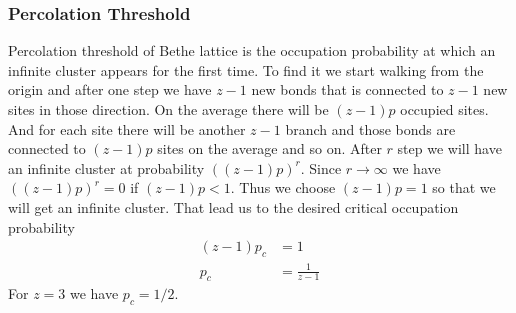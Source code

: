 	\subsubsection{Percolation Threshold}
	Percolation threshold of Bethe lattice is the occupation probability at which an infinite cluster appears for the first time. To find it we start walking from the origin and after one step we have $z-1$ new bonds that is connected to $z-1$ new sites in those direction. On the average there will be $(z-1)p$ occupied sites. And for each site there will be another $z-1$ branch and those bonds are connected to $(z-1)p$ sites on the average and so on. After $r$ step we will have an infinite cluster at probability $((z-1)p)^r$. Since $r\rightarrow \infty$ we have $((z-1)p)^r = 0$ if $(z-1)p < 1$. Thus we choose $(z-1)p = 1$ so that we will get an infinite cluster. That lead us to the desired critical  occupation  probability
	\begin{align}
		(z-1)p_c &= 1 \nonumber \\
		p_c 	 &= \frac{1}{z-1}
	\end{align}
	For $z=3$ we have $p_c = 1/2$.
